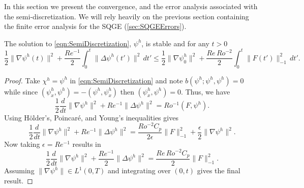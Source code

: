 In this section we present the convergence, and the error analysis associated
with the semi-discretization. We will rely heavily on the previous section
containing the finite error analysis for the SQGE (\autoref{sec:SQGEErrors}).

\begin{prop} \label{prop:Stability}
  The solution to \eqref{eqn:SemiDiscretization}, $\psi^h$, is stable and for any $t>0$
  \begin{equation}
    \frac{1}{2}\|\nabla \psi^h(t)\|^2 + \frac{Re^{-1}}{2}\int_{0}^{t}\! \|\Delta
      \psi^h(t')\|^2 \, dt' \le \frac{1}{2} \|\nabla \psi^h_0\|^2
      + \frac{Re\, Ro^{-2}}{2} \int_{0}^{t}\! \|F(t')\|^2_{-1}\, dt'.
    \label{eqn:Stability}
  \end{equation}
\end{prop}
\begin{proof}
  Take $\chi^h = \psi^h$ in \eqref{eqn:SemiDiscretization} and note $b(\psi^h;\psi^h,\psi^h)
  = 0$ while since $(\psi^h_x,\psi^h) = -(\psi^h,\psi^h_x)$ then $(\psi^h_x,
  \psi^h) = 0$. Thus, we have
  \begin{equation*}
    \frac{1}{2} \frac{d}{dt} \|\nabla \psi^h\|^2 + Re^{-1} \|\Delta \psi^h\|^2 =
      Ro^{-1} (F,\psi^h).
  \end{equation*}
  Using H\"older's, Poincar\'e, and Young's inequalities gives
  \begin{equation*}
    \frac{1}{2} \frac{d}{dt} \|\nabla \psi^h\|^2 + Re^{-1} \|\Delta \psi^h\|^2 =
      \frac{Ro^{-2} C_p}{2\epsilon} \|F\|_{-1}^2 + \frac{\epsilon}{2}\|\nabla
      \psi^h\|^2.
  \end{equation*}
  Now taking $\epsilon = Re^{-1}$ results in
  \begin{equation*}
    \frac{1}{2} \frac{d}{dt} \|\nabla \psi^h\|^2 + \frac{Re^{-1}}{2} \|\Delta
      \psi^h\|^2 = \frac{Re\,Ro^{-2} C_p}{2} \|F\|_{-1}^2.
  \end{equation*}
  Assuming $\|\nabla \psi^h\| \in L^1(0,T)$ and integrating over $(0,t)$ gives
  the final result.
\end{proof}

